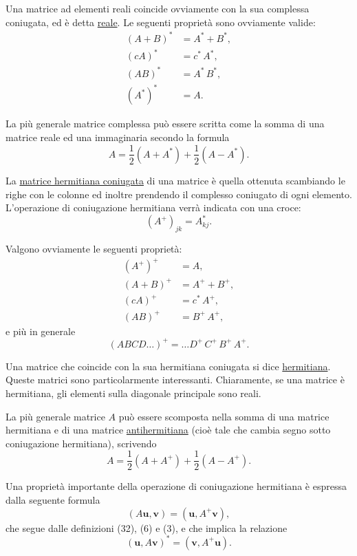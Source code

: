 \documentclass[11pt, a4paper]{book}
\numberwithin{equation}{section}
\begin{document}
Una matrice ad elementi reali coincide ovviamente con la sua complessa coniugata, ed è detta \uline{reale}. Le seguenti proprietà sono ovviamente valide:
\begin{align}
    (A + B)^* &= A^* + B^*,
    \tag{28} \\
    (cA)^* &= c^*\, A^*,
    \tag{29} \\
    (AB)^* &= A^*\, B^*,
    \tag{30} \\
    (A^*)^* &= A.
    \tag{31}
\end{align}

La più generale matrice complessa può essere scritta come la somma di una matrice reale ed una immaginaria secondo la formula
\[
    A = \frac{1}{2}\left(A + A^*\right) + \frac{1}{2}\left(A - A^*\right).
\]

La \uline{matrice hermitiana coniugata} di una matrice è quella ottenuta scambiando le righe con le colonne ed inoltre prendendo il complesso coniugato di ogni elemento. L'operazione di coniugazione hermitiana verrà indicata con una croce:
\begin{equation}
    \left(A^+\right)_{jk} = A_{kj}^*.
    \tag{32}
\end{equation}

Valgono ovviamente le seguenti proprietà:
\begin{align}
    \left(A^+\right)^+ &= A,
    \tag{33} \\
    (A + B)^+ &= A^+ + B^+,
    \tag{34} \\
    (cA)^+ &= c^*\, A^+,
    \tag{35} \\
    (AB)^+ &= B^+\, A^+,
    \tag{36a}
\end{align}
e più in generale
\begin{equation}
    (ABCD\ldots)^+ = \ldots D^+\, C^+\, B^+\, A^+.
    \tag{36b}
\end{equation}

Una matrice che coincide con la sua hermitiana coniugata si dice \uline{hermitiana}. Queste matrici sono particolarmente interessanti. Chiaramente, se una matrice è hermitiana, gli elementi sulla diagonale principale sono reali.

La più generale matrice $A$ può essere scomposta nella somma di una matrice hermitiana e di una matrice \uline{antihermitiana} (cioè tale che cambia segno sotto coniugazione hermitiana), scrivendo
\[
    A = \frac{1}{2}\left(A + A^+\right) + \frac{1}{2}\left(A - A^+\right).
\]

Una proprietà importante della operazione di coniugazione hermitiana è espressa dalla seguente formula
\begin{equation}
    (A\mathbf{u}, \mathbf{v}) = (\mathbf{u}, A^+\mathbf{v}),
    \tag{37}
\end{equation}
che segue dalle definizioni (32), (6) e (3), e che implica la relazione
\begin{equation}
    (\mathbf{u}, A\mathbf{v})^* = (\mathbf{v}, A^+\mathbf{u}).
    \tag{38a}
\end{equation}
\end{document}
